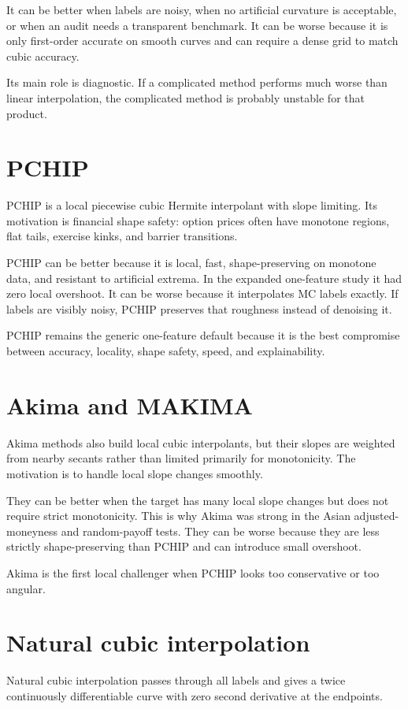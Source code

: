 \documentclass[11pt,oneside]{book}
\theoremstyle{definition}
\begin{document}
It can be better when labels are noisy, when no artificial curvature is
acceptable, or when an audit needs a transparent benchmark. It can be worse
because it is only first-order accurate on smooth curves and can require a
dense grid to match cubic accuracy.

Its main role is diagnostic. If a complicated method performs much worse than
linear interpolation, the complicated method is probably unstable for that
product.

\section{PCHIP}
PCHIP is a local piecewise cubic Hermite interpolant with slope limiting. Its
motivation is financial shape safety: option prices often have monotone
regions, flat tails, exercise kinks, and barrier transitions.

PCHIP can be better because it is local, fast, shape-preserving on monotone
data, and resistant to artificial extrema. In the expanded one-feature study it
had zero local overshoot. It can be worse because it interpolates MC labels
exactly. If labels are visibly noisy, PCHIP preserves that roughness instead of
denoising it.

PCHIP remains the generic one-feature default because it is the best compromise
between accuracy, locality, shape safety, speed, and explainability.

\section{Akima and MAKIMA}
Akima methods also build local cubic interpolants, but their slopes are
weighted from nearby secants rather than limited primarily for monotonicity.
The motivation is to handle local slope changes smoothly.

They can be better when the target has many local slope changes but does not
require strict monotonicity. This is why Akima was strong in the Asian
adjusted-moneyness and random-payoff tests. They can be worse because they are
less strictly shape-preserving than PCHIP and can introduce small overshoot.

Akima is the first local challenger when PCHIP looks too conservative or too
angular.

\section{Natural cubic interpolation}
Natural cubic interpolation passes through all labels and gives a twice
continuously differentiable curve with zero second derivative at the endpoints.
\end{document}
